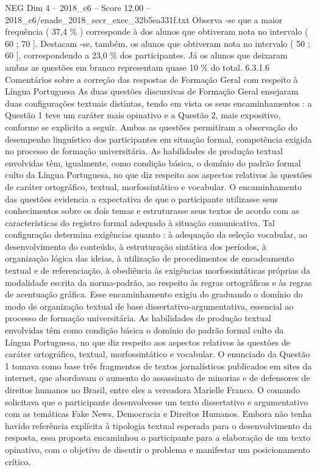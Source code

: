 \begin{textsample}{NEG Dim 4 – 2018\_c6 – Score 12.00 – 2018\_c6/enade\_2018\_secr\_exec\_32b5ea331f.txt}
Observa -se que a maior frequência ( 37,4 \% ) corresponde à dos alunos que obtiveram nota no intervalo ( 60 ; 70 ].
Destacam -se, também, os alunos que obtiveram nota no intervalo ( 50 ; 60 ], correspondendo a 23,0 \% dos participantes.
Já os alunos que deixaram ambas as questões em branco representam quase 10 \% do total. 6.3.1.6 Comentários sobre a correção das respostas de Formação Geral com respeito à Língua Portuguesa As duas questões discursivas de Formação Geral ensejaram duas configurações textuais distintas, tendo em vista os seus encaminhamentos : a Questão 1 teve um caráter mais opinativo e a Questão 2, mais expositivo, conforme se explicita a seguir.
Ambas as questões permitiram a observação do desempenho linguístico dos participantes em situação formal, competência exigida no processo de formação universitária.
As habilidades de produção textual envolvidas têm, igualmente, como condição básica, o domínio do padrão formal culto da Língua Portuguesa, no que diz respeito aos aspectos relativos às questões de caráter ortográfico, textual, morfossintático e vocabular.
O encaminhamento das questões evidencia a expectativa de que o participante utilizasse seus conhecimentos sobre os dois temas e estruturasse seus textos de acordo com as características do registro formal adequado à situação comunicativa.
Tal configuração determina exigências quanto : à adequação da seleção vocabular, ao desenvolvimento do conteúdo, à estruturação sintática dos períodos, à organização lógica das ideias, à utilização de procedimentos de encadeamento textual e de referenciação, à obediência às exigências morfossintáticas próprias da modalidade escrita da norma-padrão, ao respeito às regras ortográficas e às regras de acentuação gráfica.
Esse encaminhamento exigiu do graduando o domínio do modo de organização textual de base dissertativo-argumentativa, essencial ao processo de formação universitária.
As habilidades de produção textual envolvidas têm como condição básica o domínio do padrão formal culto da Língua Portuguesa, no que diz respeito aos aspectos relativos às questões de caráter ortográfico, textual, morfossintático e vocabular.
O enunciado da Questão 1 tomava como base três fragmentos de textos jornalísticos publicados em sites da internet, que abordavam o aumento do assassinato de minorias e de defensores de direitos humanos no Brasil, entre eles a vereadora Marielle Franco.
O comando solicitava que o participante desenvolvesse um texto dissertativo e argumentativo com as temáticas Fake News, Democracia e Direitos Humanos.
Embora não tenha havido referência explícita à tipologia textual esperada para o desenvolvimento da resposta, essa proposta encaminhou o participante para a elaboração de um texto opinativo, com o objetivo de discutir o problema e manifestar um posicionamento crítico.

\end{textsample}
